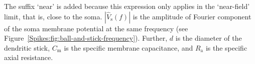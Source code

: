 The suffix `near' is added because this expression only applies in the `near-field' limit, that is,
close to the soma.
$|\hat{V}_\mathrm{s}(f)|$ is the amplitude of Fourier component of the soma membrane potential at the same
frequency (see Figure~\ref{Spikes:fig:ball-and-stick-frequency}). Further, $d$ is the diameter of the dendritic
stick, $C_\mathrm{m}$ is the specific membrane capacitance, and $R_\mathrm{a}$ is the specific axial resistance.  


